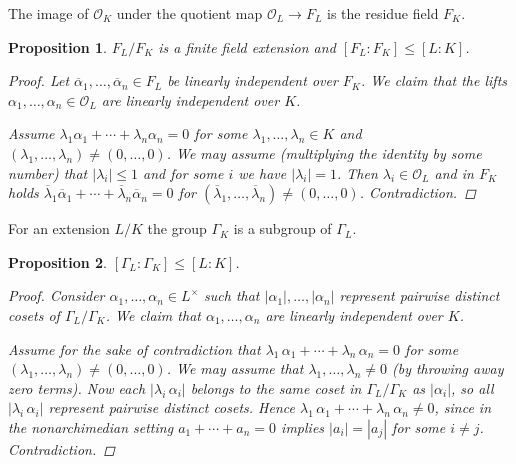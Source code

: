 \documentclass{article}
\theoremstyle{myplain}
\newtheorem{proposition}{Proposition}[section]
\theoremstyle{mydefinition}
\begin{document}
The image of $\mathcal{O}_K$ under the quotient map $\mathcal{O}_L \to F_L$ is the residue field
$F_K$.

\begin{proposition}
  $F_L/F_K$ is a finite field extension and $[F_L : F_K] \le [L : K]$.

  \begin{proof}
    Let $\overline{\alpha}_1, \ldots, \overline{\alpha}_n \in F_L$ be linearly
    independent over $F_K$. We claim that the lifts
    $\alpha_1, \ldots, \alpha_n \in \mathcal{O}_L$ are linearly independent over $K$.

    Assume $\lambda_1 \alpha_1 + \cdots + \lambda_n \alpha_n = 0$ for some
    $\lambda_1,\ldots,\lambda_n \in K$ and
    $(\lambda_1,\ldots,\lambda_n) \ne (0, \ldots, 0)$. We may assume
    (multiplying the identity by some number) that $|\lambda_i| \le 1$ and for
    some $i$ we have $|\lambda_i| = 1$. Then $\lambda_i \in \mathcal{O}_L$ and in $F_K$
    holds
    $\overline{\lambda}_1 \overline{\alpha}_1 + \cdots + \overline{\lambda}_n \overline{\alpha}_n = 0$
    for $(\overline{\lambda}_1, \ldots, \overline{\lambda}_n) \ne (0,\ldots,0)$.
    Contradiction.
  \end{proof}
\end{proposition}

For an extension $L/K$ the group $\Gamma_K$ is a subgroup of $\Gamma_L$.

\begin{proposition}
  $[\Gamma_L : \Gamma_K] \le [L:K]$.

  \begin{proof}
    Consider $\alpha_1, \ldots, \alpha_n \in L^\times$ such that
    $|\alpha_1|, \ldots, |\alpha_n|$ represent pairwise distinct cosets of
    $\Gamma_L / \Gamma_K$. We claim that $\alpha_1, \ldots, \alpha_n$ are
    linearly independent over $K$.

    Assume for the sake of contradiction that
    $\lambda_1\,\alpha_1 + \cdots + \lambda_n\,\alpha_n = 0$ for some
    $(\lambda_1,\ldots,\lambda_n) \ne (0,\ldots,0)$. We may assume that
    $\lambda_1, \ldots, \lambda_n \ne 0$ (by throwing away zero terms). Now each
    $|\lambda_i\,\alpha_i|$ belongs to the same coset in $\Gamma_L / \Gamma_K$
    as $|\alpha_i|$, so all $|\lambda_i\,\alpha_i|$ represent pairwise distinct
    cosets. Hence $\lambda_1\,\alpha_1 + \cdots + \lambda_n\,\alpha_n \ne 0$,
    since in the nonarchimedian setting $a_1 + \cdots + a_n = 0$ implies
    $|a_i| = |a_j|$ for some $i \ne j$. Contradiction.
  \end{proof}
\end{proposition}
\end{document}
